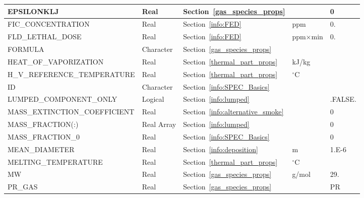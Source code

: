 \documentclass[11pt]{book}
\begin{document}
\begin{longtable}{@{\extracolsep{\fill}}|l|l|l|l|l|}
{\ct EPSILONKLJ}                    & Real        & Section~\ref{gas_species_props}         &                   & 0             \\ \hline
{\ct FIC\_CONCENTRATION}            & Real        & Section~\ref{info:FED}                  & ppm               & 0.            \\ \hline
{\ct FLD\_LETHAL\_DOSE}             & Real        & Section~\ref{info:FED}                  & ppm$\times$min    & 0.            \\ \hline
{\ct FORMULA }                      & Character   & Section~\ref{gas_species_props}         &                   &               \\ \hline
{\ct HEAT\_OF\_VAPORIZATION}        & Real        & Section~\ref{thermal_part_props}        & kJ/kg             &               \\ \hline
{\ct H\_V\_REFERENCE\_TEMPERATURE}  & Real        & Section~\ref{thermal_part_props}        & $^\circ$C         &               \\ \hline
{\ct ID }                           & Character   & Section~\ref{info:SPEC_Basics}          &                   &               \\ \hline
{\ct LUMPED\_COMPONENT\_ONLY}       & Logical     & Section~\ref{info:lumped}               &                   & {\ct .FALSE.} \\ \hline
{\ct MASS\_EXTINCTION\_COEFFICIENT} & Real        & Section~\ref{info:alternative_smoke}    &                   & 0             \\ \hline
{\ct MASS\_FRACTION(:)}             & Real Array  & Section~\ref{info:lumped}               &                   & 0             \\ \hline
{\ct MASS\_FRACTION\_0}             & Real        & Section~\ref{info:SPEC_Basics}          &                   & 0             \\ \hline
{\ct MEAN\_DIAMETER}                & Real        & Section~\ref{info:deposition}           & m                 & 1.E-6         \\ \hline
{\ct MELTING\_TEMPERATURE}          & Real        & Section~\ref{thermal_part_props}        & $^\circ$C         &               \\ \hline
{\ct MW}                            & Real        & Section~\ref{gas_species_props}         & g/mol             & 29.           \\ \hline
{\ct PR\_GAS}                       & Real        & Section~\ref{gas_species_props}         &                   & {\ct PR}      \\ \hline

\end{longtable}
\end{document}
